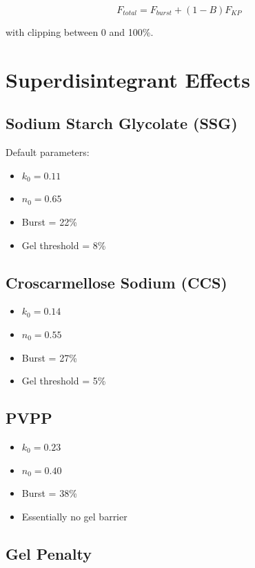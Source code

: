 \documentclass[11pt]{article}
\begin{document}
\begin{equation}
F_{total}
=
F_{burst}
+
(1-B)F_{KP}
\end{equation}

with clipping between 0 and 100\%.

\section{Superdisintegrant Effects}

\subsection{Sodium Starch Glycolate (SSG)}

Default parameters:

\begin{itemize}
\item $k_0=0.11$
\item $n_0=0.65$
\item Burst = 22\%
\item Gel threshold = 8\%
\end{itemize}

\subsection{Croscarmellose Sodium (CCS)}

\begin{itemize}
\item $k_0=0.14$
\item $n_0=0.55$
\item Burst = 27\%
\item Gel threshold = 5\%
\end{itemize}

\subsection{PVPP}

\begin{itemize}
\item $k_0=0.23$
\item $n_0=0.40$
\item Burst = 38\%
\item Essentially no gel barrier
\end{itemize}

\subsection{Gel Penalty}
\end{document}
